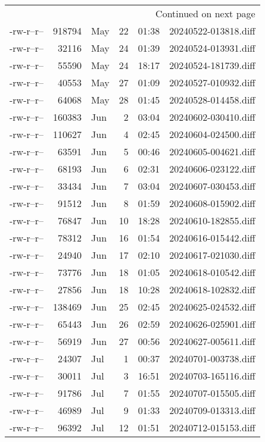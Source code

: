 \documentclass[a4paper]{article}
\begin{document}
\begin{longtable}{lrlrrl}
\hline
\endhead
\hline\multicolumn{6}{r}{Continued on next page} \\
\endfoot
\endlastfoot
\hline
-rw-r--r-- & 918794 & May & 22 & 01:38 & 20240522-013818.diff\\[0pt]
-rw-r--r-- & 32116 & May & 24 & 01:39 & 20240524-013931.diff\\[0pt]
-rw-r--r-- & 55590 & May & 24 & 18:17 & 20240524-181739.diff\\[0pt]
-rw-r--r-- & 40553 & May & 27 & 01:09 & 20240527-010932.diff\\[0pt]
-rw-r--r-- & 64068 & May & 28 & 01:45 & 20240528-014458.diff\\[0pt]
-rw-r--r-- & 160383 & Jun & 2 & 03:04 & 20240602-030410.diff\\[0pt]
-rw-r--r-- & 110627 & Jun & 4 & 02:45 & 20240604-024500.diff\\[0pt]
-rw-r--r-- & 63591 & Jun & 5 & 00:46 & 20240605-004621.diff\\[0pt]
-rw-r--r-- & 68193 & Jun & 6 & 02:31 & 20240606-023122.diff\\[0pt]
-rw-r--r-- & 33434 & Jun & 7 & 03:04 & 20240607-030453.diff\\[0pt]
-rw-r--r-- & 91512 & Jun & 8 & 01:59 & 20240608-015902.diff\\[0pt]
-rw-r--r-- & 76847 & Jun & 10 & 18:28 & 20240610-182855.diff\\[0pt]
-rw-r--r-- & 78312 & Jun & 16 & 01:54 & 20240616-015442.diff\\[0pt]
-rw-r--r-- & 24940 & Jun & 17 & 02:10 & 20240617-021030.diff\\[0pt]
-rw-r--r-- & 73776 & Jun & 18 & 01:05 & 20240618-010542.diff\\[0pt]
-rw-r--r-- & 27856 & Jun & 18 & 10:28 & 20240618-102832.diff\\[0pt]
-rw-r--r-- & 138469 & Jun & 25 & 02:45 & 20240625-024532.diff\\[0pt]
-rw-r--r-- & 65443 & Jun & 26 & 02:59 & 20240626-025901.diff\\[0pt]
-rw-r--r-- & 56919 & Jun & 27 & 00:56 & 20240627-005611.diff\\[0pt]
-rw-r--r-- & 24307 & Jul & 1 & 00:37 & 20240701-003738.diff\\[0pt]
-rw-r--r-- & 30011 & Jul & 3 & 16:51 & 20240703-165116.diff\\[0pt]
-rw-r--r-- & 91786 & Jul & 7 & 01:55 & 20240707-015505.diff\\[0pt]
-rw-r--r-- & 46989 & Jul & 9 & 01:33 & 20240709-013313.diff\\[0pt]
-rw-r--r-- & 96392 & Jul & 12 & 01:51 & 20240712-015153.diff\\[0pt]
\end{longtable}
\rmfamily
\end{document}
